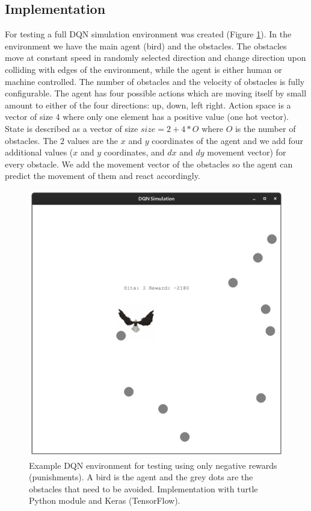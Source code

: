 \documentclass[b5paper]{book}
\begin{document}
\subsection{Implementation}

For testing a full DQN simulation environment was created (Figure \ref{fig:bird}). In the environment we have the main agent (bird) and the obstacles. The obstacles move at constant speed in randomly selected direction and change direction upon colliding with edges of the environment, while the agent is either human or machine controlled. The number of obstacles and the velocity of obstacles is fully configurable. The agent has four possible actions which are moving itself by small amount to either of the four directions: up, down, left right. Action space is a vector of size 4 where only one element has a positive value (one hot vector). State is described as a vector of size \( size = 2 + 4 * O \) where \( O \) is the number of obstacles. The \( 2 \) values are the \( x \) and \( y \) coordinates of the agent and we add four additional values (\( x \) and \( y \) coordinates, and \( dx \) and \( dy \) movement vector) for every obstacle. We add the movement vector of the obstacles so the agent can predict the movement of them and react accordingly.

\begin{figure}[!ht]
  \centering
  \includegraphics[scale=0.1]{figures/dqn_bird.png} 
  \caption{Example DQN environment for testing using only negative rewards (punishments). A bird is the agent and the grey dots are the obstacles that need to be avoided. Implementation with turtle Python module and Keras (TensorFlow).}
  \label{fig:bird}
\end{figure}
\end{document}
